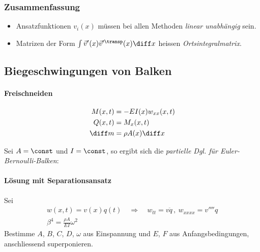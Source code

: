 		\subsubsection{Zusammenfassung} %
			\begin{itemize}
				\item Ansatzfunktionen $v_i(x)$ müssen bei allen Methoden \emph{linear unabhängig} sein.
				\item Matrizen der Form $\int \vec v'(x) \vec v'^\transp (x) \diff x$ heissen \emph{Ortsintegralmatrix}.
			\end{itemize}
	
	\subsection{Biegeschwingungen von Balken} %
		\resizebox{\columnwidth}{!}{
			
		}
		
		\paragraph{Freischneiden} %
			\begin{align*}
				M(x,t) &= -EI(x)w_{xx}(x,t) \\
				Q(x,t) &= M_x(x,t) \\
				\diff m &= \rho A(x) \diff x
			\end{align*}
			
			Sei $A = \const$ und $I = \const$, so ergibt sich die \emph{partielle Dgl. für Euler-Bernoulli-Balken}:
		
			\begin{center}
				
			\end{center}
		
		\paragraph{Lösung mit Separationsansatz} %
			Sei
			\begin{gather*}
				w(x,t) = v(x)q(t) \quad \Rightarrow \quad w_{tt} = v \ddot q \, , \ w_{xxxx} = v''''q \\
				\beta^4 = \frac{\rho A}{EI} \omega^2
			\end{gather*}
			Bestimme $A$, $B$, $C$, $D$, $\omega$ aus Einspannung und $E$, $F$ aus Anfangsbedingungen, anschliessend superponieren.
		
